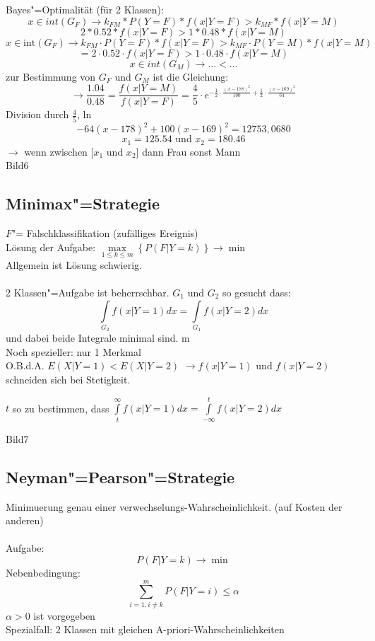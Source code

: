 \documentclass[a4paper,12pt]{scrreprt}
\begin{document}
Bayes"=Optimalität (für 2 Klassen):
$$ x \in int ( G_F ) \rightarrow k_{FM} * P (Y=F) * f( x | Y=F) > k_{MF} * f ( x | Y=M)$$
$$ 2 * 0.52* f ( x | Y = F) > 1 * 0.48 * f ( x | Y = M) $$
$$x\in\text{int}(G_F)\to k_{FM}\cdot P(Y=F)*f(x|Y=F)>k_{MF}\cdot
P(Y=M)*f(x|Y=M)$$
$$=2\cdot0.52\cdot f(x|Y=F)>1\cdot0.48\cdot f(x|Y=M)$$
$$ x \in int (G_M) \rightarrow \dots < \dots  $$ 
zur Bestimmung von $G_F$ und $G_M$ ist die Gleichung:
\large
$$\to\frac{1.04}{0.48}=\frac{f(x|Y=M)}{f(x|Y=F)}=\frac{4}{5}\cdot e^{-\frac{1}{2}\cdot\frac{(x-178)^2}{100}+\frac{1}{2}\cdot\frac{(x-169)^2}{64}}$$
\normalsize
Division durch $\frac{4}{5}$, ln\\
$$-64 ( x -178)^2 + 100 (x-169)^2 = 12753,0680$$
$$x_1=125.54 \text{ und }  x_2=180.46$$
$ \rightarrow$ wenn zwischen $[x_1$ und $x_2]$ dann Frau sonst Mann\\
Bild6\\

\subsection{Minimax"=Strategie}
$F$"= Falschklassifikation (zufälliges Ereignis)\\ 
Lösung der Aufgabe: $\max\limits_{1\le k\le m}\left\{ P(F|Y=k)
\right\}\to \min$\\
Allgemein ist Lösung schwierig.\\
\\
2 Klassen"=Aufgabe ist beherrschbar. $G_1$ und $G_2$ so gesucht
dass:\\
$$\int\limits_{G_2}f(x|Y=1)dx=\int\limits_{G_1}f(x|Y=2)dx$$
und dabei beide Integrale minimal sind.
m\\
Noch spezieller: nur 1 Merkmal\\
O.B.d.A. $E(X|Y=1)<E(X|Y=2)$
$\to f(x|Y=1)$ und $f(x|Y=2)$ schneiden sich bei Stetigkeit.

$t$ so zu bestimmen, dass $\int\limits_t^\infty f(x|Y=1)dx
=\int\limits^t_{-\infty} f(x|Y=2)dx$

Bild7

\subsection{Neyman"=Pearson"=Strategie}

Minimuerung genau einer verwechselungs-Wahrscheinlichkeit. (auf Kosten der anderen)\\
\\
Aufgabe: $$P(F|Y=k) \to \min$$
Nebenbedingung: $$ \sum_{i=1, i \neq k}^m P(F|Y=i) \leq \alpha $$
$\alpha > 0$ ist vorgegeben\\
Spezialfall: 2 Klassen mit gleichen A-priori-Wahrscheinlichkeiten
\end{document}
